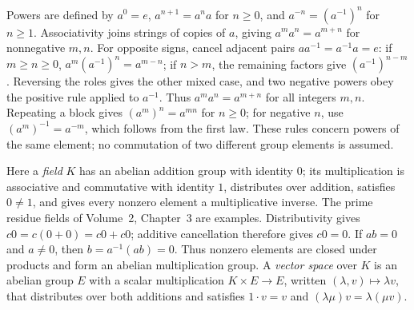 Powers are defined by $a^0=e$, $a^{n+1}=a^na$ for $n\ge0$, and
$a^{-n}=(a^{-1})^n$ for $n\ge1$. Associativity joins strings of copies
of $a$, giving $a^ma^n=a^{m+n}$ for nonnegative $m,n$. For opposite
signs, cancel adjacent pairs $aa^{-1}=a^{-1}a=e$: if $m\ge n\ge0$,
$a^m(a^{-1})^n=a^{m-n}$; if $n>m$, the remaining factors give
$(a^{-1})^{n-m}$. Reversing the roles gives the other mixed case, and
two negative powers obey the positive rule applied to $a^{-1}$.
Thus $a^ma^n=a^{m+n}$ for all integers $m,n$.
Repeating a block gives $(a^m)^n=a^{mn}$ for $n\ge0$;
for negative $n$, use $(a^m)^{-1}=a^{-m}$, which follows from the
first law. These rules concern powers of the same element; no commutation
of two different group elements is assumed.

Here a \emph{field} $K$ has an abelian addition group with identity $0$;
its multiplication is associative and commutative with identity $1$,
distributes over addition, satisfies $0\ne1$, and gives every nonzero
element a multiplicative inverse. The prime residue fields of Volume~2,
Chapter~3 are examples. Distributivity gives $c0=c(0+0)=c0+c0$;
additive cancellation therefore gives $c0=0$. If $ab=0$ and $a\ne0$,
then $b=a^{-1}(ab)=0$. Thus nonzero elements are closed under products
and form an abelian multiplication group. A \emph{vector space} over $K$ is an abelian group $E$ with a scalar multiplication $K\times E\to E$, written $(\lambda,v)\mapsto\lambda v$, that distributes over both additions and satisfies $1\cdot v=v$ and $(\lambda\mu)v=\lambda(\mu v)$.

